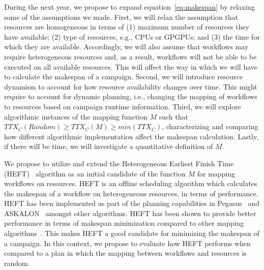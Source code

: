During the next year, we propose to expand equation~\ref{eq:makespan} by relaxing some of the assumptions we made.
First, we will relax the assumption that resources are homogeneous in terms of (1) maximum number of resources they have available; (2) type of resources, e.g., CPUs or GPGPUs; and (3) the time for which they are available.
Accordingly, we will also assume that workflows may require heterogeneous resources and, as a result, workflows will not be able to be executed on all available resources. 
This will affect the way in which we will have to calculate the makespan of a campaign.
Second, we will introduce resource dynamism to account for how resource availability changes over time. 
This might require to account for dynamic planning, i.e., changing the mapping of workflows to resources based on campaign runtime information.
Third, we will explore algorithmic instances of the mapping function $ M $ such that $TTX_{C}(Random) \geq TTX_{C}(M) \geq min(TTX_{C})$, characterizing and comparing how different algorithmic implementation affect the makespan calculation.
Lastly, if there will be time, we will investigate a quantitative definition of $ M $.


We propose to utilize and extend the Heterogeneous Earliest Finish Time (HEFT)~\cite{topcuoglu2002performance} algorithm  as an initial candidate of the function $ M $ for mapping workflows on resources.
HEFT is an offline scheduling algorithm which calculates the makespan of a workflow on heterogeneous resources, in terms of performance.
HEFT has been implemented as part of the planning capabilities in Pegasus~\cite{deelman2015pegasus} and ASKALON~\cite{fahringer2005askalon} amongst other algorithms.
HEFT has been shown to provide better performance in terms of makespan minimization compared to other mapping algorithms~\cite{topcuoglu2002performance,fahringer2005askalon,canon2008comparative}.
This makes HEFT a good candidate for minimizing the makespan of a campaign.
In this context, we propose to evaluate how HEFT performs when compared to a plan in which the mapping between workflows and resources is random.


